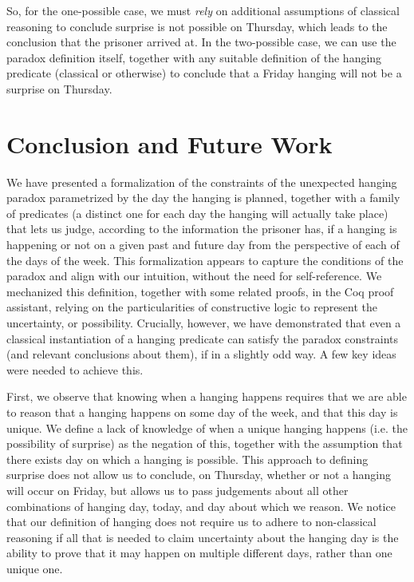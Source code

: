\documentclass[runningheads]{llncs}
\begin{document}
So, for the one-possible case, we must \emph{rely} on additional assumptions of
classical reasoning to conclude surprise is not possible on Thursday,
which leads to the conclusion that the prisoner arrived at.
In the two-possible case, we can use the paradox definition itself, together with
any suitable definition of the hanging predicate (classical or otherwise) to conclude that a Friday
hanging will not be a surprise on Thursday.

\section{Conclusion and Future Work}

We have presented a formalization of the constraints of the unexpected hanging paradox
parametrized by the day the hanging is planned,
together with a family of predicates (a distinct one for each day the hanging
will actually take place) that lets us judge, according to the information the prisoner has,
if a hanging is happening or not on
a given past and future day from the perspective of each of the days of the week.
This formalization appears to capture the
conditions of the paradox and align with our intuition, without the need
for self-reference.
We mechanized this definition, together with some related proofs, in the Coq
proof assistant, relying on the particularities of constructive logic to represent
the uncertainty, or possibility. Crucially, however, we have demonstrated that
even a classical instantiation of a hanging predicate can satisfy the paradox
constraints (and relevant conclusions about them), if in a slightly odd way.
A few key ideas were needed to achieve this.

First, we observe that knowing when a hanging happens requires that we are able to
reason that a hanging happens on some day of the week, and that this day is unique.
We define a lack of knowledge of when a unique hanging happens (i.e. the possibility of surprise)
as the negation of this,
together with the assumption that there exists day on which a hanging is possible.
This approach to defining surprise does not allow us to conclude, on Thursday,
whether or not a hanging will occur on Friday, but allows us to pass judgements
about all other combinations of hanging day, today, and day about which we reason.
We notice that
our definition of hanging does not require us to adhere to non-classical
reasoning if all that is needed to claim uncertainty about the hanging day
is the ability to prove that it may happen on multiple different days, rather than one unique one.
\end{document}
